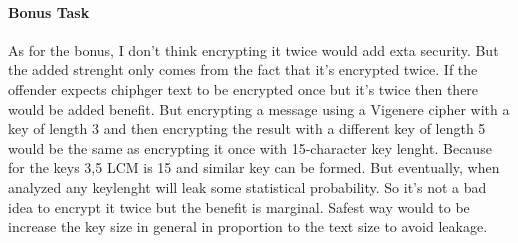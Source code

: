 \documentclass{article}
\begin{document}
\paragraph{Bonus Task}
As for the bonus, I don't think encrypting it twice would add exta security. But the added strenght only comes from the fact that it's
encrypted twice. If the offender expects chiphger text to be encrypted once but it's twice then there would be added benefit. But encrypting a
message using a Vigenere cipher with a
key of
length 3 and then encrypting the result  with a different key of length 5 would be the same as encrypting it once with 15-character key
lenght. Because for the keys 3,5 LCM is 15 and similar key can be formed. But eventually, when analyzed any keylenght will leak some
statistical probability. So it's not a bad idea to encrypt it twice but the benefit is marginal. Safest way would to be increase the key
size in general in proportion to the text size to avoid leakage.\\
\end{document}
